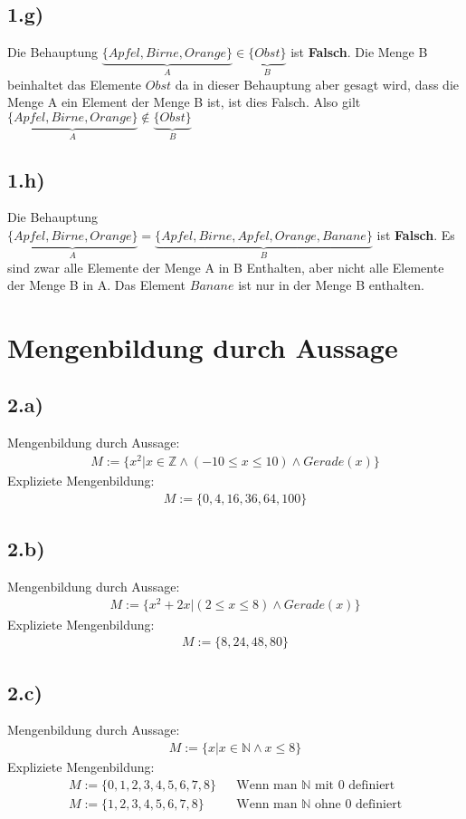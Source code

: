 \documentclass[10pt,ngerman]{scrartcl}
\begin{document}
\subsection{1.g)}
Die Behauptung $\underbrace{\{Apfel,Birne,Orange\}}_{A} \in \underbrace{\{Obst\}}_{B}$ ist \textbf{Falsch}.
Die Menge B beinhaltet das Elemente $Obst$ da in dieser Behauptung aber gesagt wird, dass die Menge A ein Element der Menge B ist, ist dies Falsch. Also gilt $\underbrace{\{Apfel,Birne,Orange\}}_{A} \notin \underbrace{\{Obst\}}_{B}$

\subsection{1.h)}
Die Behauptung $\underbrace{\{Apfel,Birne,Orange\}}_{A} = \underbrace{\{Apfel,Birne,Apfel,Orange,Banane\}}_{B}$ ist \textbf{Falsch}. Es sind zwar alle Elemente der Menge A in B Enthalten, aber nicht alle Elemente der Menge B in A. Das Element $Banane$ ist nur in der Menge B enthalten.

\section{Mengenbildung durch Aussage}
\subsection{2.a)}
Mengenbildung durch Aussage:
\begin{align*}
M:=\{x^2 | x \in \mathbb{Z} \wedge (-10 \leq x \leq 10) \wedge Gerade(x)\}
\end{align*}
Expliziete Mengenbildung:
\begin{align*}
M:=\{0,4,16,36,64,100\}
\end{align*}
\subsection{2.b)}
Mengenbildung durch Aussage:
\begin{align*}
M:=\{x^2+2x|(2\leq x \leq 8) \wedge Gerade(x)\}
\end{align*}
Expliziete Mengenbildung:
\begin{align*}
 M:=\{8,24,48,80\}
\end{align*}
\subsection{2.c)}
Mengenbildung durch Aussage:
\begin{align*}
M:=\{x|x \in \mathbb{N} \wedge x \leq 8\}
\end{align*}
Expliziete Mengenbildung:
\setcounter{equation}{0}
\begin{align}
M:=\{0,1,2,3,4,5,6,7,8\} && \text{Wenn man } \mathbb{N} \text{ mit 0 definiert} \\
M:=\{1,2,3,4,5,6,7,8\} && \text{Wenn man } \mathbb{N} \text{ ohne 0 definiert}
\end{align}
\end{document}
